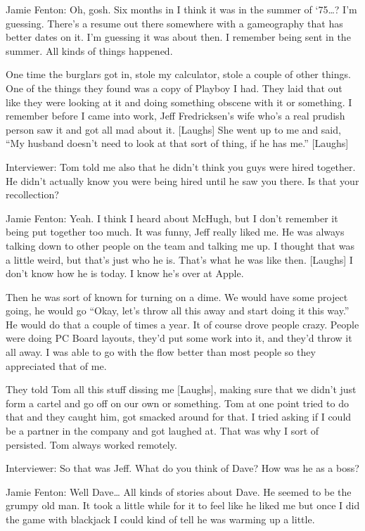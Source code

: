 \textcolor{interviewee}{Jamie Fenton:} Oh, gosh. Six months in I think it was in the summer of ‘75…? I’m guessing. There’s a resume out there somewhere with a gameography that has better dates on it. I’m guessing it was about then. I remember being sent in the summer. All kinds of things happened.

One time the burglars got in, stole my calculator, stole a couple of other things. One of the things they found was a copy of Playboy I had. They laid that out like they were looking at it and doing something obscene with it or something. I remember before I came into work, Jeff Fredricksen’s wife who’s a real prudish person saw it and got all mad about it. [Laughs] She went up to me and said, “My husband doesn’t need to look at that sort of thing, if he has me.” [Laughs] 

\textcolor{interviewer}{Interviewer:} Tom told me also that he didn’t think you guys were hired together. He didn’t actually know you were being hired until he saw you there. Is that your recollection?

\textcolor{interviewee}{Jamie Fenton:} Yeah. I think I heard about McHugh, but I don’t remember it being put together too much. It was funny, Jeff really liked me. He was always talking down to other people on the team and talking me up. I thought that was a little weird, but that’s just who he is. That’s what he was like then. [Laughs] I don’t know how he is today. I know he’s over at Apple.

Then he was sort of known for turning on a dime. We would have some project going, he would go “Okay, let’s throw all this away and start doing it this way.” He would do that a couple of times a year. It of course drove people crazy. People were doing PC Board layouts, they’d put some work into it, and they’d throw it all away. I was able to go with the flow better than most people so they appreciated that of me.

They told Tom all this stuff dissing me [Laughs], making sure that we didn’t just form a cartel and go off on our own or something. Tom at one point tried to do that and they caught him, got smacked around for that. I tried asking if I could be a partner in the company and got laughed at. That was why I sort of persisted. Tom always worked remotely.

\textcolor{interviewer}{Interviewer:} So that was Jeff. What do you think of Dave? How was he as a boss?

\textcolor{interviewee}{Jamie Fenton:} Well Dave… All kinds of stories about Dave. He seemed to be the grumpy old man. It took a little while for it to feel like he liked me but once I did the game with blackjack I could kind of tell he was warming up a little.

